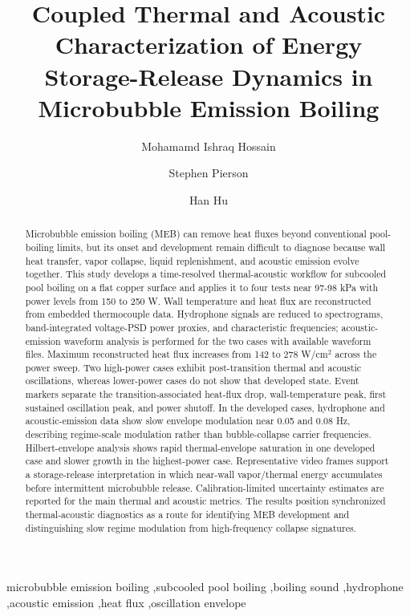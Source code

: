 \documentclass[final,1p,times]{elsarticle}
\begin{document}
\begin{frontmatter}

\title{Coupled Thermal and Acoustic Characterization of Energy Storage-Release Dynamics in Microbubble Emission Boiling}

\author[inst1]{Mohamamd Ishraq Hossain}
\author[inst1]{Stephen Pierson}
\author[inst1]{Han Hu}

\begin{abstract}
Microbubble emission boiling (MEB) can remove heat fluxes beyond conventional pool-boiling limits, but its onset and development remain difficult to diagnose because wall heat transfer, vapor collapse, liquid replenishment, and acoustic emission evolve together. This study develops a time-resolved thermal-acoustic workflow for subcooled pool boiling on a flat copper surface and applies it to four tests near 97-98 kPa with power levels from 150 to 250 W. Wall temperature and heat flux are reconstructed from embedded thermocouple data. Hydrophone signals are reduced to spectrograms, band-integrated voltage-PSD power proxies, and characteristic frequencies; acoustic-emission waveform analysis is performed for the two cases with available waveform files. Maximum reconstructed heat flux increases from 142 to 278 W/cm$^2$ across the power sweep. Two high-power cases exhibit post-transition thermal and acoustic oscillations, whereas lower-power cases do not show that developed state. Event markers separate the transition-associated heat-flux drop, wall-temperature peak, first sustained oscillation peak, and power shutoff. In the developed cases, hydrophone and acoustic-emission data show slow envelope modulation near 0.05 and 0.08 Hz, describing regime-scale modulation rather than bubble-collapse carrier frequencies. Hilbert-envelope analysis shows rapid thermal-envelope saturation in one developed case and slower growth in the highest-power case. Representative video frames support a storage-release interpretation in which near-wall vapor/thermal energy accumulates before intermittent microbubble release. Calibration-limited uncertainty estimates are reported for the main thermal and acoustic metrics. The results position synchronized thermal-acoustic diagnostics as a route for identifying MEB development and distinguishing slow regime modulation from high-frequency collapse signatures.
\end{abstract}

\begin{keyword}
microbubble emission boiling \sep subcooled pool boiling \sep boiling sound \sep hydrophone \sep acoustic emission \sep heat flux \sep oscillation envelope
\end{keyword}



\end{frontmatter}
\end{document}
